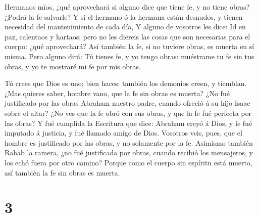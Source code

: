  Hermanos míos, ¿qué aprovechará si alguno dice que tiene
fe, y no tiene obras? ¿Podrá la fe salvarle?  Y si el
hermano ó la hermana están desnudos, y tienen necesidad del
mantenimiento de cada día,  Y alguno de vosotros les dice:
Id en paz, calentaos y hartaos; pero no les diereis las cosas que son
necesarias para el cuerpo: ¿qué aprovechará?  Así también
la fe, si no tuviere obras, es muerta en sí misma.  Pero
alguno dirá: Tú tienes fe, y yo tengo obras: muéstrame tu fe sin tus
obras, y yo te mostraré mi fe por mis obras.

 Tú crees que Dios es uno; bien haces: también los demonios
creen, y tiemblan.  ¿Mas quieres saber, hombre vano, que la
fe sin obras es muerta?  ¿No fué justificado por las obras
Abraham nuestro padre, cuando ofreció á su hijo Isaac sobre el altar?
 ¿No ves que la fe obró con sus obras, y que la fe fué
perfecta por las obras?  Y fué cumplida la Escritura que
dice: Abraham creyó á Dios, y le fué imputado á justicia, y fué llamado
amigo de Dios.  Vosotros veis, pues, que el hombre es
justificado por las obras, y no solamente por la fe. 
Asimismo también Rahab la ramera, ¿no fué justificada por obras, cuando
recibió los mensajeros, y los echó fuera por otro camino? 
Porque como el cuerpo sin espíritu está muerto, así también la fe sin
obras es muerta.

\hypertarget{section-2}{%
\section{3}\label{section-2}}

